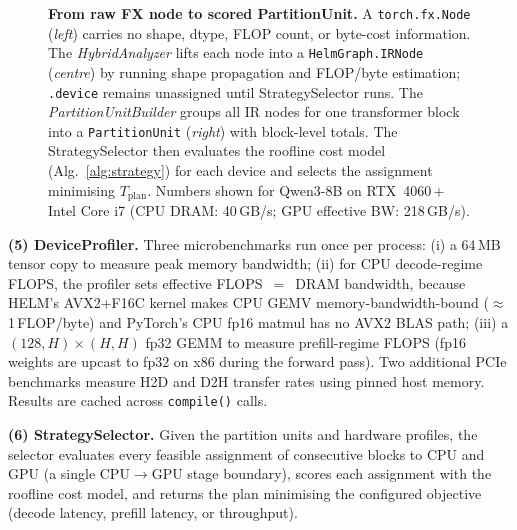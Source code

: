 \documentclass[lettersize,journal]{IEEEtran}
\begin{document}
\begin{figure}[!t]
\caption{%
\textbf{From raw FX node to scored PartitionUnit.}
A \texttt{torch.fx.Node} (\emph{left}) carries no shape, dtype, FLOP count,
or byte-cost information.
The \emph{HybridAnalyzer} lifts each node into a \texttt{HelmGraph.IRNode}
(\emph{centre}) by running shape propagation and FLOP/byte estimation;
\texttt{.device} remains unassigned until StrategySelector runs.
The \emph{PartitionUnitBuilder} groups all IR nodes for one transformer block
into a \texttt{PartitionUnit} (\emph{right}) with block-level totals.
The StrategySelector then evaluates the roofline cost model (Alg.~\ref{alg:strategy})
for each device and selects the assignment minimising $T_\text{plan}$.
Numbers shown for Qwen3-8B on RTX~4060\,+\,Intel Core i7
(CPU DRAM: 40\,GB/s; GPU effective BW: 218\,GB/s).}
\label{fig:ir_comparison}
\end{figure}

\textbf{(5) DeviceProfiler.} Three microbenchmarks run once per process:
(i) a 64\,MB tensor copy to measure peak memory bandwidth; (ii) for
CPU decode-regime FLOPS, the profiler sets effective FLOPS~$=$~DRAM
bandwidth, because HELM's AVX2+F16C kernel makes CPU GEMV
memory-bandwidth-bound ($\approx$1\,FLOP/byte) and PyTorch's CPU
fp16 matmul has no AVX2 BLAS path; (iii) a $(128, H) \times (H, H)$
fp32 GEMM to measure prefill-regime FLOPS (fp16 weights are upcast
to fp32 on x86 during the forward pass).
Two additional PCIe benchmarks measure H2D and D2H transfer rates using
pinned host memory. Results are cached across \texttt{compile()} calls.

\textbf{(6) StrategySelector.} Given the partition units and hardware
profiles, the selector evaluates every feasible assignment of consecutive
blocks to CPU and GPU (a single CPU$\to$GPU stage boundary), scores each
assignment with the roofline cost model, and returns the plan minimising
the configured objective (decode latency, prefill latency, or throughput).
\end{document}
